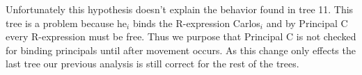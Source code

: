 \documentclass[20pt]{article}
\begin{document}
Unfortunately this hypothesis doesn't explain the behavior found in tree 11.
This tree is a problem because he$_i$ binds the R-expression Carlos$_i$ and by
Principal C every R-expression must be free. Thus we purpose that Principal C is
not checked for binding principals until after movement occurs. As this change
only effects the last tree our previous analysis is still correct for the rest
of the trees.
\end{document}
